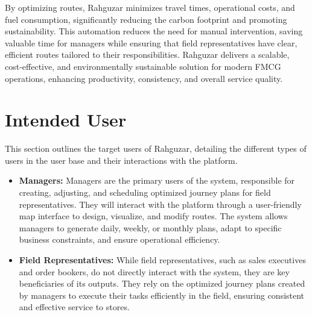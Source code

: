 By optimizing routes, Rahguzar minimizes travel times, operational costs, and fuel consumption, significantly reducing the carbon footprint and promoting sustainability. This automation reduces the need for manual intervention, saving valuable time for managers while ensuring that field representatives have clear, efficient routes tailored to their responsibilities. Rahguzar delivers a scalable, cost-effective, and environmentally sustainable solution for modern FMCG operations, enhancing productivity, consistency, and overall service quality.

\section{Intended User}

This section outlines the target users of Rahguzar, detailing the different types of users in the user base and their interactions with the platform.
\begin{itemize}

         \item \textbf{Managers:} Managers are the primary users of the system, responsible for creating, adjusting, and scheduling optimized journey plans for field representatives. They will interact with the platform through a user-friendly map interface to design, visualize, and modify routes. The system allows managers to generate daily, weekly, or monthly plans, adapt to specific business constraints, and ensure operational efficiency.
         \item \textbf{Field Representatives:} While field representatives, such as sales executives and order bookers, do not directly interact with the system, they are key beneficiaries of its outputs. They rely on the optimized journey plans created by managers to execute their tasks efficiently in the field, ensuring consistent and effective service to stores.




    
\end{itemize}


